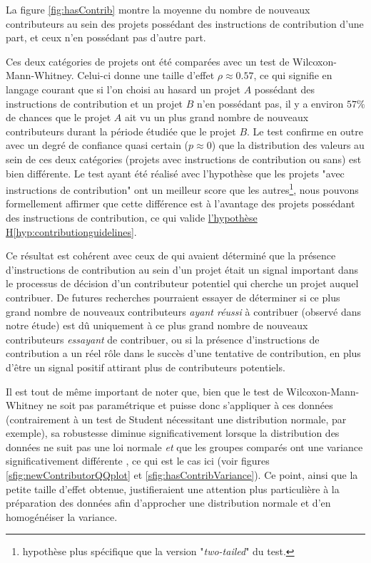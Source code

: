 \documentclass[dvipsnames]{llncs}
\begin{document}
    La figure \ref{fig:hasContrib} montre la moyenne du nombre de nouveaux contributeurs au sein des projets
    possédant des instructions de contribution d'une part, et ceux n'en possédant pas d'autre part.

    Ces deux catégories de projets ont été comparées avec un test de Wilcoxon-Mann-Whitney. Celui-ci donne une
    taille d'effet $ρ \approx 0.57$, ce qui signifie en langage courant que si l'on choisi au hasard un projet
    $A$ possédant des instructions de contribution et un projet $B$ n'en possédant pas, il y a environ $57\%$
    de chances que le projet $A$ ait vu un plus grand nombre de nouveaux contributeurs durant la période
    étudiée que le projet $B$. Le test confirme en outre avec un degré de confiance quasi certain ($p \approx
    0$) que la distribution des valeurs au sein de ces deux catégories (projets avec instructions de
    contribution ou sans) est bien différente. Le test ayant été réalisé avec l'hypothèse que les projets
    "avec instructions de contribution" ont un meilleur score que les autres\footnote{hypothèse plus
    spécifique que la version "\emph{two-tailed}" du test.}, nous pouvons formellement affirmer que cette
    différence est à l'avantage des projets possédant des instructions de contribution, ce qui valide
    \hyperref[hyp:contributionguidelines]{l'hypothèse H\ref*{hyp:contributionguidelines}}.

    Ce résultat est cohérent avec ceux de \textcite[p.~11]{signals-2019} qui avaient déterminé que la présence
    d'instructions de contribution au sein d'un projet était un signal important dans le processus de décision
    d'un contributeur potentiel qui cherche un projet auquel contribuer. De futures recherches pourraient
    essayer de déterminer si ce plus grand nombre de nouveaux contributeurs \emph{ayant réussi} à contribuer
    (observé dans notre étude) est dû uniquement à ce plus grand nombre de nouveaux contributeurs
    \emph{essayant} de contribuer, ou si la présence d'instructions de contribution a un réel rôle dans le
    succès d'une tentative de contribution, en plus d'être un signal positif attirant plus de contributeurs
    potentiels.

    Il est tout de même important de noter que, bien que le test de Wilcoxon-Mann-Whitney ne soit pas
    paramétrique et puisse donc s'appliquer à ces données (contrairement à un test de Student nécessitant une
    distribution normale, par exemple), sa robustesse diminue significativement lorsque la distribution des
    données ne suit pas une loi normale \emph{et} que les groupes comparés ont une variance significativement
    différente \parencite{WMW-robustness-1998}, ce qui est le cas ici (voir figures
    \ref{sfig:newContributorQQplot} et \ref{sfig:hasContribVariance}). Ce point, ainsi que la petite taille
    d'effet obtenue, justifieraient une attention plus particulière à la préparation des données afin
    d'approcher une distribution normale et d'en homogénéiser la variance.
\end{document}
